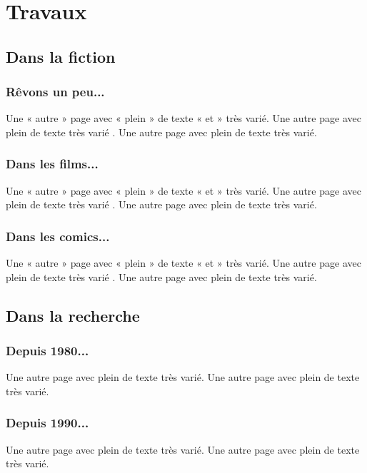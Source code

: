 \chapter{Travaux}

    \label{CHAP_2_TRAVAUX}

    \minitoc

    \section{Dans la fiction}

        \subsection{Rêvons un peu...}
            Une « autre » page avec « plein » de texte « et » très varié.
            Une autre page avec plein de texte très varié .
            Une autre page avec plein de texte très varié.

        \subsection{Dans les films...}
            Une « autre » page avec « plein » de texte « et » très varié.
            Une autre page avec plein de texte très varié .
            Une autre page avec plein de texte très varié.

        \subsection{Dans les comics...}
            Une « autre » page avec « plein » de texte « et » très varié.
            Une autre page avec plein de texte très varié .
            Une autre page avec plein de texte très varié.

    \section{Dans la recherche}

        \subsection{Depuis 1980...}
            Une autre page avec plein de texte très varié.
            Une autre page avec plein de texte très varié.

        \subsection{Depuis 1990...}
            Une autre page avec plein de texte très varié.
            Une autre page avec plein de texte très varié.

